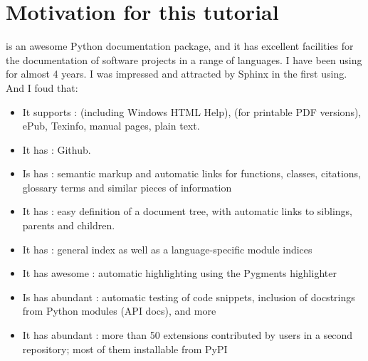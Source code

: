 \documentclass[letterpaper,11pt,english]{sphinxmanual}
\begin{document}
\section{Motivation for this tutorial}
\label{\detokenize{preface:motivation-for-this-tutorial}}
 is an awesome Python documentation package, and it has excellent facilities for the documentation of software projects in a range of languages. I have been using  for almost 4 years. I was impressed and attracted by Sphinx in the first using. And I foud that:
\begin{itemize}
\item {} 
It supports :  (including Windows HTML Help),  (for printable PDF versions), ePub, Texinfo, manual pages, plain text.

\item {} 
It has : Github.

\item {} 
Is has : semantic markup and automatic links for functions, classes, citations, glossary terms and similar pieces of information

\item {} 
It has : easy definition of a document tree, with automatic links to siblings, parents and children.

\item {} 
It has : general index as well as a language-specific module indices

\item {} 
It has awesome : automatic highlighting using the Pygments highlighter

\item {} 
Is has abundant : automatic testing of code snippets, inclusion of docstrings from Python modules (API docs), and more

\item {} 
It has abundant : more than 50 extensions contributed by users in a second repository; most of them installable from PyPI

\end{itemize}
\end{document}
